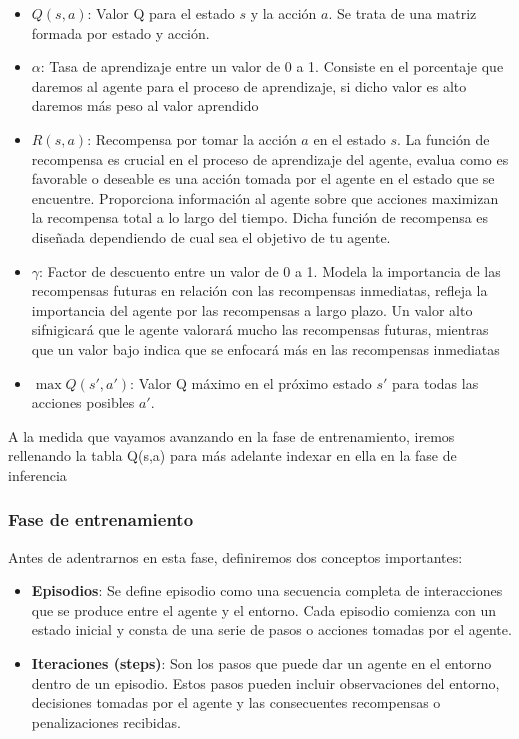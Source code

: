   \begin{itemize}
    \item \textbf{$Q(s, a)$}: Valor Q para el estado $s$ y la acción $a$. Se trata de una matriz formada por estado y acción.
    \item \textbf{$\alpha$}: Tasa de aprendizaje entre un valor de 0 a 1. Consiste en el porcentaje que daremos al agente para el proceso de aprendizaje, si dicho valor es alto daremos más peso al valor aprendido 
    \item \textbf{$R(s, a)$}: Recompensa por tomar la acción $a$ en el estado $s$. La función de recompensa es crucial en el proceso de aprendizaje del agente, evalua como es favorable o deseable
    es una acción tomada por el agente en el estado que se encuentre. Proporciona información al agente sobre que acciones maximizan la recompensa total a lo largo del tiempo. Dicha función
    de recompensa es diseñada dependiendo de cual sea el objetivo de tu agente. 
    \item \textbf{$\gamma$}: Factor de descuento entre un valor de 0 a 1. Modela la importancia de las recompensas futuras en relación con las recompensas inmediatas, refleja la importancia del agente
    por las recompensas a largo plazo. Un valor alto sifnigicará que le agente valorará mucho las recompensas futuras, mientras que un valor bajo indica que se enfocará más en las recompensas
    inmediatas
    \item \textbf{$\max Q(s', a')$}: Valor Q máximo en el próximo estado $s'$ para todas las acciones posibles $a'$.
\end{itemize}

A la medida que vayamos avanzando en la fase de entrenamiento, iremos rellenando la tabla Q(s,a) para más adelante indexar en ella en la fase de inferencia

\subsubsection{Fase de entrenamiento}
\label{sec:fases_ql}
 Antes de adentrarnos en esta fase, definiremos dos conceptos importantes:
 \begin{itemize}
  \item \textbf{Episodios}: Se define episodio como una secuencia completa de interacciones que se produce entre el agente y el entorno. Cada episodio comienza con un estado inicial y consta de una serie 
  de pasos o acciones tomadas por el agente.
  \item \textbf{Iteraciones (steps)}: Son los pasos que puede dar un agente en el entorno dentro de un episodio. Estos pasos pueden incluir observaciones del entorno, decisiones tomadas por el agente
  y las consecuentes recompensas o penalizaciones recibidas.
\end{itemize}

